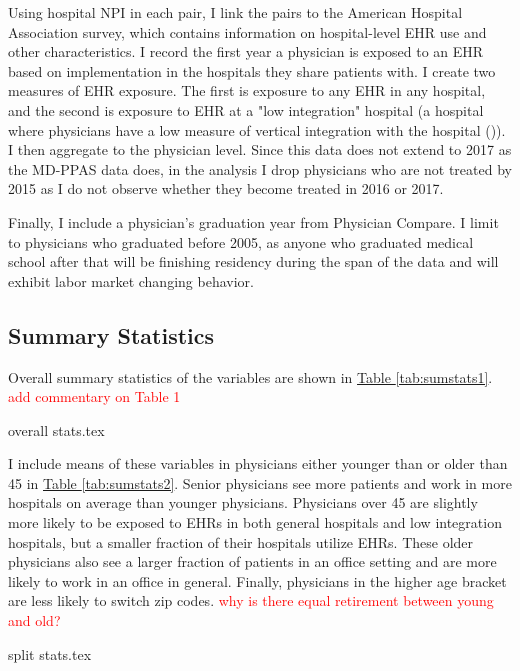 \documentclass[11pt]{article}
\begin{document}
Using hospital NPI in each pair, I link the pairs to the American Hospital Association survey, which contains information on hospital-level EHR use and other characteristics. I record the first year a physician is exposed to an EHR based on implementation in the hospitals they share patients with. I create two measures of EHR exposure. The first is exposure to any EHR in any hospital, and the second is exposure to EHR at a "low integration" hospital (a hospital where physicians have a low measure of vertical integration with the hospital (\cite{madison2004hospital})). I then aggregate to the physician level. Since this data does not extend to 2017 as the MD-PPAS data does, in the analysis I drop physicians who are not treated by 2015 as I do not observe whether they become treated in 2016 or 2017. 

Finally, I include a physician's graduation year from Physician Compare. I limit to physicians who graduated before 2005, as anyone who graduated medical school after that will be finishing residency during the span of the data and will exhibit labor market changing behavior. 

\subsection{Summary Statistics}

Overall summary statistics of the variables are shown in \hyperref[tab:sumstats1]{Table \ref{tab:sumstats1}}. \textcolor{red}{add commentary on Table 1}

\vspace{5mm}
{overall stats.tex}
\vspace{5mm}

I include means of these variables in physicians either younger than or older than 45 in \hyperref[tab:sumstats2]{Table \ref{tab:sumstats2}}. Senior physicians see more patients and work in more hospitals on average than younger physicians. Physicians over 45 are slightly more likely to be exposed to EHRs in both general hospitals and low integration hospitals, but a smaller fraction of their hospitals utilize EHRs. These older physicians also see a larger fraction of patients in an office setting and are more likely to work in an office in general. Finally, physicians in the higher age bracket are less likely to switch zip codes. \textcolor{red}{why is there equal retirement between young and old?}


\vspace{5mm}
{split stats.tex}
\vspace{5mm}
\end{document}
